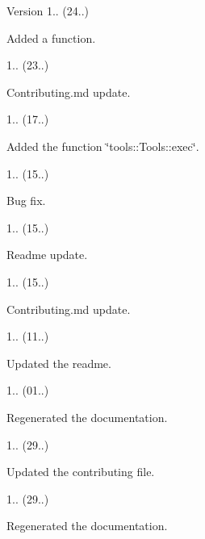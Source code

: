 \begin{DoxyVersion}{Version}
1.. (24..)
\begin{DoxyItemize}
\item Added a function. 
\end{DoxyItemize}

1.. (23..)
\begin{DoxyItemize}
\item Contributing.\+md update. 
\end{DoxyItemize}

1.. (17..)
\begin{DoxyItemize}
\item Added the function \char`\"{}tools\+::\+Tools\+::exec\char`\"{}. 
\end{DoxyItemize}

1.. (15..)
\begin{DoxyItemize}
\item Bug fix. 
\end{DoxyItemize}

1.. (15..)
\begin{DoxyItemize}
\item Readme update. 
\end{DoxyItemize}

1.. (15..)
\begin{DoxyItemize}
\item Contributing.\+md update. 
\end{DoxyItemize}

1.. (11..)
\begin{DoxyItemize}
\item Updated the readme. 
\end{DoxyItemize}

1.. (01..)
\begin{DoxyItemize}
\item Regenerated the documentation. 
\end{DoxyItemize}

1.. (29..)
\begin{DoxyItemize}
\item Updated the contributing file. 
\end{DoxyItemize}

1.. (29..)
\begin{DoxyItemize}
\item Regenerated the documentation. 
\end{DoxyItemize}


\end{DoxyVersion}

